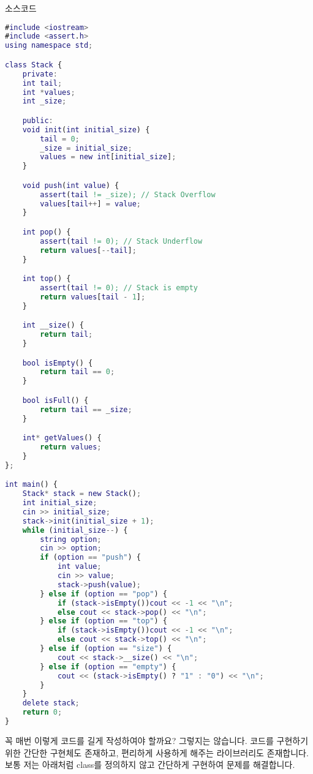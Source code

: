 \documentclass{article}
\begin{document}
\noindent 소스코드\\
\lstset{style=myStyle}
\begin{lstlisting}[caption=소스코드, language=Matlab]
#include <iostream>
#include <assert.h>
using namespace std;

class Stack {
    private:
    int tail;
    int *values;
    int _size;

    public:
    void init(int initial_size) {
        tail = 0;
        _size = initial_size;
        values = new int[initial_size];
    }

    void push(int value) {
        assert(tail != _size); // Stack Overflow
        values[tail++] = value;
    }

    int pop() {
        assert(tail != 0); // Stack Underflow
        return values[--tail];
    }

    int top() {
        assert(tail != 0); // Stack is empty
        return values[tail - 1];
    }

    int __size() {
        return tail;
    }

    bool isEmpty() {
        return tail == 0;
    }

    bool isFull() {
        return tail == _size;
    }

    int* getValues() {
        return values;
    }
};

int main() {
    Stack* stack = new Stack();
    int initial_size;
    cin >> initial_size;
    stack->init(initial_size + 1);
    while (initial_size--) {
        string option;
        cin >> option;
        if (option == "push") {
            int value;
            cin >> value;
            stack->push(value);
        } else if (option == "pop") {
            if (stack->isEmpty())cout << -1 << "\n";
            else cout << stack->pop() << "\n";
        } else if (option == "top") {
            if (stack->isEmpty())cout << -1 << "\n";
            else cout << stack->top() << "\n";
        } else if (option == "size") {
            cout << stack->__size() << "\n";
        } else if (option == "empty") {
            cout << (stack->isEmpty() ? "1" : "0") << "\n";
        }
    }
    delete stack;
    return 0;
}
\end{lstlisting}

\noindent 꼭 매번 이렇게 코드를 길게 작성하여야 할까요? 그렇지는 않습니다. 코드를 구현하기 위한 간단한 구현체도 존재하고, 편리하게 사용하게 해주는 라이브러리도 존재합니다.\\

\noindent 보통 저는 아래처럼 class를 정의하지 않고 간단하게 구현하여 문제를 해결합니다.
\end{document}
